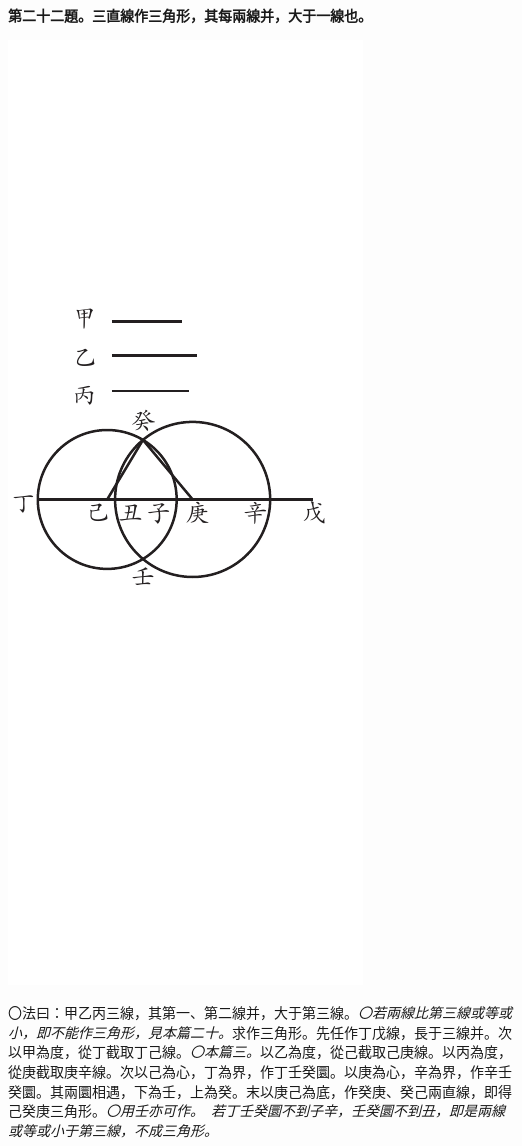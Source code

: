 \documentclass[12pt,b5paper,landscape]{article}
\newcommand{\ccom}[1]{{\footnotesize \emph{〇#1}}}
\newcommand{\bcom}[1]{〇#1}
\newcommand{\cthm}[1]{{
\vspace{8pt}

\bfseries #1}}
\begin{document}
\begin{multicols}{2}
\cthm{第二十二題。三直線作三角形，其每兩線并，大于一線也。}
\begin{center}
    \includegraphics[angle=90]{eu67}  
\end{center}
\bcom{法曰：甲乙丙三線，其第一、第二線并，大于第三線。\ccom{若兩線比第三線或等或小，即不能作三角形，見本篇二十。}求作三角形。先任作丁戊線，長于三線并。次以甲為度，從丁截取丁己線。\ccom{本篇三。}以乙為度，從己截取己庚線。以丙為度，從庚截取庚辛線。次以己為心，丁為界，作丁壬癸圜。以庚為心，辛為界，作辛壬癸圜。其兩圜相遇，下為壬，上為癸。末以庚己為底，作癸庚、癸己兩直線，即得己癸庚三角形。\ccom{用壬亦可作。　若丁壬癸圜不到子辛，壬癸圜不到丑，即是兩線或等或小于第三線，不成三角形。}}

\end{multicols}
\end{document}
